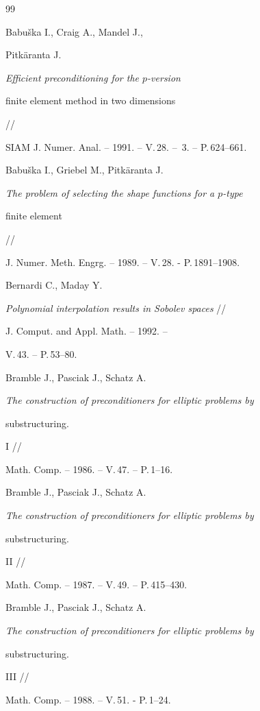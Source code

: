 \begin{thebibliography}{99}




Babu\v{s}ka I., Craig A., Mandel J.,


Pitk\"{a}ranta J.


{\it Efficient preconditioning for the $p$-version


finite element method in two dimensions} //


SIAM J. Numer. Anal. -- 1991. -- V.\,28. -- \No\,3. -- P.\,624--661.




Babu\v{s}ka I., Griebel M., Pitk\"{a}ranta J.


{\it The problem of selecting the shape functions for a $p$-type


finite element} //


J. Numer. Meth. Engrg. -- 1989. -- V.\,28. - P.\,1891--1908.




Bernardi C., Maday Y.


{\it Polynomial interpolation results in Sobolev spaces} //


J. Comput. and Appl. Math. -- 1992. --


V.\,43. -- P.\,53--80.




Bramble J., Pasciak J., Schatz A.


{\it The construction of preconditioners for elliptic problems by


substructuring.} I //


Math. Comp. -- 1986. -- V.\,47. -- P.\,1--16.




Bramble J., Pasciak J., Schatz A.


{\it The construction of preconditioners for elliptic problems by


substructuring.} II //


Math. Comp. -- 1987. -- V.\,49. -- P.\,415--430.




Bramble J., Pasciak J., Schatz A.


{\it The construction of preconditioners for elliptic problems by


substructuring.} III //


Math. Comp. -- 1988. -- V.\,51. - P.\,1--24.





\end{thebibliography}
